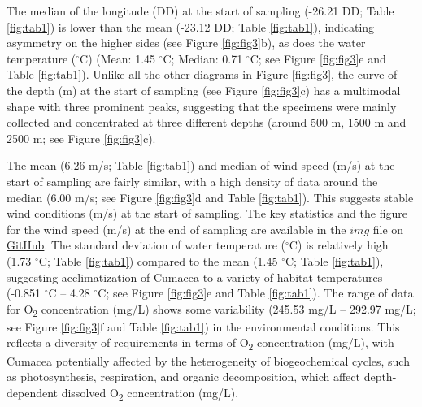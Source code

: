 {The median of the longitude (DD) at the start of sampling (-26.21 DD; Table \ref{fig:tab1}) is lower than the mean (-23.12 DD; Table \ref{fig:tab1}), indicating asymmetry on the higher sides (see Figure \ref{fig:fig3}b), as does the water temperature ($^\circ$C) (Mean: 1.45 $^\circ$C; Median: 0.71 $^\circ$C; see Figure \ref{fig:fig3}e and Table \ref{fig:tab1}). Unlike all the other diagrams in Figure \ref{fig:fig3}, the curve of the depth (m) at the start of sampling (see Figure \ref{fig:fig3}c) has a multimodal shape with three prominent peaks, suggesting that the specimens were mainly collected and concentrated at three different depths (around 500 m, 1500 m and 2500 m; see Figure \ref{fig:fig3}c).

The mean (6.26 m/s; Table \ref{fig:tab1}) and median of wind speed (m/s) at the start of sampling are fairly similar, with a high density of data around the median (6.00 m/s; see Figure \ref{fig:fig3}d and Table \ref{fig:tab1}). This suggests stable wind conditions (m/s) at the start of sampling. The key statistics and the figure for the wind speed (m/s) at the end of sampling are available in the $img$ file on \href{https://github.com/tahiri-lab/Cumacea_aPhyloGeo}{GitHub}. The standard deviation of water temperature ($^\circ$C) is relatively high (1.73 $^\circ$C; Table \ref{fig:tab1}) compared to the mean (1.45 $^\circ$C; Table \ref{fig:tab1}), suggesting acclimatization of Cumacea to a variety of habitat temperatures (-0.851 $^\circ$C – 4.28 $^\circ$C; see Figure \ref{fig:fig3}e and Table \ref{fig:tab1}). The range of data for O\textsubscript{2} concentration (mg/L) shows some variability (245.53 mg/L – 292.97 mg/L; see Figure \ref{fig:fig3}f and Table \ref{fig:tab1}) in the environmental conditions. This reflects a diversity of requirements in terms of O\textsubscript{2} concentration (mg/L), with Cumacea potentially affected by the heterogeneity of biogeochemical cycles, such as photosynthesis, respiration, and organic decomposition, which affect depth-dependent dissolved O\textsubscript{2} concentration (mg/L).

}
